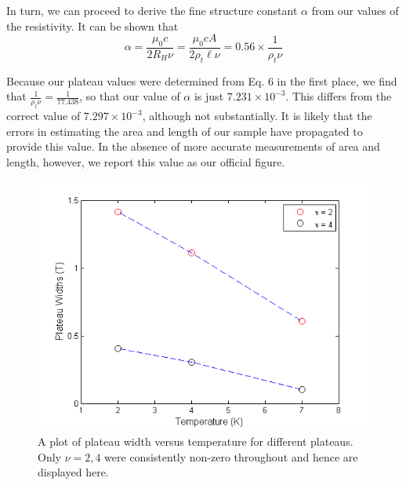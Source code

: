 \documentclass[aps,prl,nofootinbib,twocolumn,superscriptaddress,groupedaddress]{revtex4}  %
\begin{document}
In turn, we can proceed to derive the fine structure constant $\alpha$ from our values of the resistivity. It can be shown that\cite{nobel} 
\begin{equation}
\alpha = \frac{\mu_{0} c}{2 R_{H} \nu} = \frac{\mu_{0} c A}{2\rho_{t}\ell\nu} = 0.56 \times \frac{1}{\rho_{t}\nu} 
\end{equation}

Because our plateau values were determined from Eq. 6 in the first place, we find that $\frac{1}{\rho_{t}\nu} =  \frac{1}{77.438}$, so that our value of $\alpha$ is just $7.231 \times 10^{-3}$. This differs from the correct value of $7.297 \times 10^{-3}$, although not substantially. It is likely that the errors in estimating the area and length of our sample have propagated to provide this value. In the absence of more accurate measurements of area and length, however, we report this value as our official figure.

\begin{figure}[t]
\centering
\includegraphics[scale = 0.6]{../Analysis/plateauwidths.png}
\caption{A plot of plateau width versus temperature for different plateaus. Only $\nu = 2,4$ were consistently non-zero throughout and hence are displayed here.} 
\end{figure}
\end{document}
